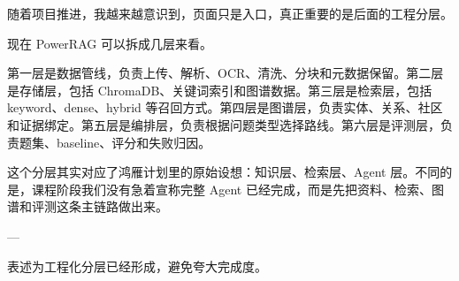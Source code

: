 \documentclass[10pt, a4paper]{ctexart}
\begin{document}
\begin{tcolorbox}[colback=white, colframe=primary!35, title={\textbf{第 15 页：系统从页面走向工程化分层}}, beforeafter skip=2.0pt]
\begin{minipage}[t]{0.72\textwidth}
  \linespread{1.0}\selectfont\footnotesize
  随着项目推进，我越来越意识到，页面只是入口，真正重要的是后面的工程分层。

现在 PowerRAG 可以拆成几层来看。

第一层是数据管线，负责上传、解析、OCR、清洗、分块和元数据保留。第二层是存储层，包括 ChromaDB、关键词索引和图谱数据。第三层是检索层，包括 keyword、dense、hybrid 等召回方式。第四层是图谱层，负责实体、关系、社区和证据绑定。第五层是编排层，负责根据问题类型选择路线。第六层是评测层，负责题集、baseline、评分和失败归因。

这个分层其实对应了鸿雁计划里的原始设想：知识层、检索层、Agent 层。不同的是，课程阶段我们没有急着宣称完整 Agent 已经完成，而是先把资料、检索、图谱和评测这条主链路做出来。

---
\end{minipage}
\hfill
\begin{minipage}[t]{0.25\textwidth}
  \fontsize{7.5}{9.5}\selectfont
  \begin{tcolorbox}[colback=orange!5, colframe=orange!45, title=\textbf{讲述重点}, left=0.6mm, right=0.6mm, top=0.8mm, bottom=0.8mm, arc=0.8mm, boxrule=0.4pt, beforeafter skip=0pt]
    表述为工程化分层已经形成，避免夸大完成度。
  \end{tcolorbox}
\end{minipage}
\end{tcolorbox}
\end{document}
